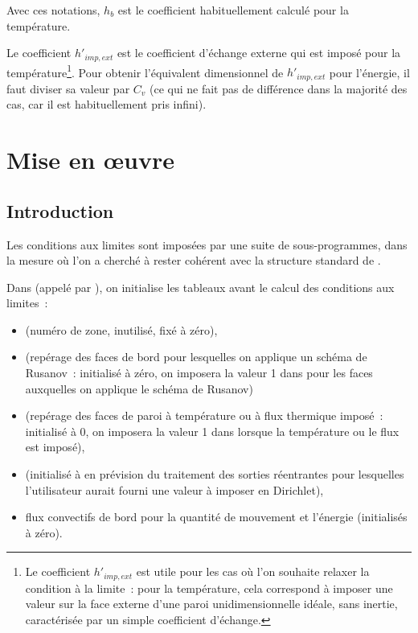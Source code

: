 Avec ces notations, $h_b$ est le coefficient habituellement calculé pour la
température.

Le coefficient $h'_{imp,ext}$ est le coefficient d'échange externe qui est
imposé pour la température\footnote{Le coefficient $h'_{imp,ext}$
est utile pour les cas où l'on
souhaite relaxer la condition à la limite~:
pour la température, cela correspond à imposer une valeur sur la face
externe d'une paroi unidimensionnelle idéale, sans inertie,
caractérisée par un simple coefficient d'échange.}.
Pour obtenir l'équivalent dimensionnel de $h'_{imp,ext}$ pour l'énergie,
il faut diviser sa valeur par $C_v$ (ce qui ne fait pas de différence dans
la majorité des cas, car il est habituellement pris infini).

\section*{Mise en \oe uvre}

\subsection*{Introduction}

Les conditions aux limites sont imposées par une suite de sous-programmes,
dans la mesure où l'on a cherché à rester cohérent avec la structure
standard de \CS.

Dans  (appelé par ), on initialise les tableaux
avant le calcul des conditions aux limites~:
\begin{itemize}
\item {} (numéro de zone, inutilisé, fixé à zéro),
\item {} (repérage des faces de bord pour
lesquelles on applique un schéma de Rusanov~: initialisé à zéro,
on imposera la valeur 1 dans  pour les faces auxquelles on applique le schéma
de Rusanov)
\item {} (repérage des faces de paroi à température ou
à flux thermique imposé~: initialisé à 0, on imposera la valeur 1
dans  lorsque la température ou le flux est imposé),
\item {} (initialisé à  en prévision
du traitement des sorties réentrantes pour lesquelles l'utilisateur
aurait fourni une valeur à imposer en Dirichlet),
\item flux convectifs de bord pour la quantité de mouvement et l'énergie
(initialisés à zéro).
\end{itemize}



